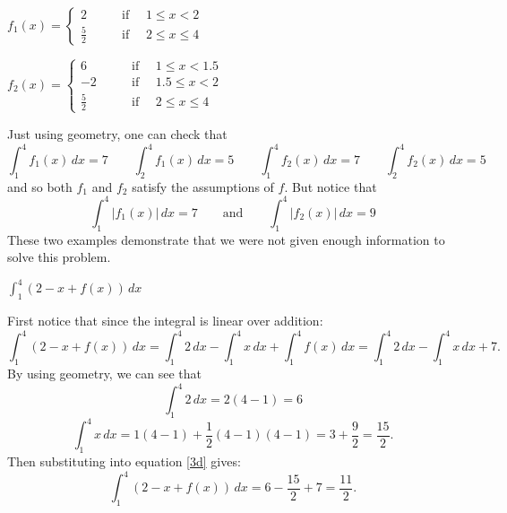 \documentclass[handout, nooutcomes]{ximera}
\renewenvironment{freeResponse}{
\ifhandout\setbox0\vbox\bgroup\else
\begin{trivlist}\item[\hskip \labelsep\bfseries Solution:\hspace{2ex}]
\fi}
{\ifhandout\egroup\else
\end{trivlist}
\fi}
\renewcommand{\d}{\,d}
\begin{document}
\begin{problem}
\begin{enumerate}
\begin{freeResponse}
		$f_1(x) =   \left\{ \begin{array}{cl}
	2		 	&	\qquad \text{if } \quad 1 \leq x < 2					\\
	\frac{5}{2}		&	\qquad \text{if } \quad 2 \leq x \leq 4		\end{array} \right.  $
	
	$f_2(x) =   \left\{ \begin{array}{cl}
	6		 	&	\qquad \text{if } \quad 1 \leq x < 1.5					\\
	-2		 	&	\qquad \text{if } \quad 1.5 \leq x < 2					\\
	\frac{5}{2}		&	\qquad \text{if } \quad 2 \leq x \leq 4		\end{array} \right.  $
	
	Just using geometry, one can check that
	$$ \int_1^4 f_1(x)\d x = 7	\qquad	\int_2^4 f_1(x)\d x = 5	\qquad	\int_1^4 f_2(x)\d x = 7	\qquad	\int_2^4 f_2(x)\d x = 5 $$
	and so both $f_1$ and $f_2$ satisfy the assumptions of $f$.  But notice that
	$$\int_1^4 \left| f_1(x) \right| \d x = 7	\qquad	\text{and}		\qquad	\int_1^4 \left| f_2(x) \right| \d x = 9  $$
	These two examples demonstrate that we were not given enough information to solve this problem.
		
		\end{freeResponse}
		
	\item  $\int_1^4 \left( 2 - x + f(x) \right) \d x$
		\begin{freeResponse}
		First notice that since the integral is linear over addition:
			\begin{equation}\label{3d}
			\int_1^4 \left( 2 - x + f(x) \right) \d x = \int_1^4 2 \d x - \int_1^4 x \d x + \int_1^4 f(x) \d x = \int_1^4 2 \d x - \int_1^4 x \d x + 7.
			\end{equation}
		By using geometry, we can see that
			\begin{equation*}
			\int_1^4 2 \d x = 2(4-1) = 6
			\end{equation*}
			\begin{equation*}
			\int_1^4 x \d x = 1(4-1) + \frac{1}{2} (4-1)(4-1) = 3 + \frac{9}{2} = \frac{15}{2}.
			\end{equation*}
		Then substituting into equation \eqref{3d} gives:
			\begin{equation*}
			\int_1^4 \left( 2 - x + f(x) \right) \d x = 6 - \frac{15}{2} + 7 = \frac{11}{2}.
			\end{equation*}
		\end{freeResponse}
	\end{enumerate}
\end{problem}
\end{document}
